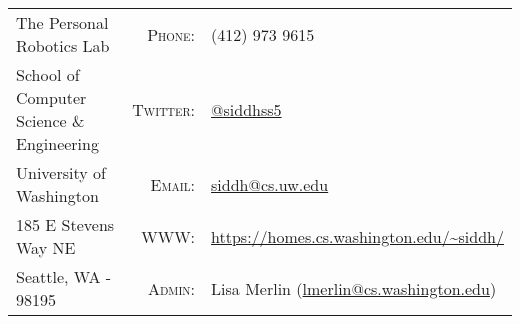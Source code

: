 
\begin{center}
\begin{tabular}{lrl}
The Personal Robotics Lab & \textsc{Phone:} & (412) 973 9615 \\
School of Computer Science \& Engineering& \textsc{Twitter:} & \href{https://twitter.com/siddhss5}{@siddhss5} \\
University of Washington& \textsc{Email:} & \url{siddh@cs.uw.edu}\\
185 E Stevens Way NE&  \textsc{WWW:} & \url{https://homes.cs.washington.edu/~siddh/}\\
Seattle, WA - 98195 & \textsc{Admin:} & Lisa Merlin (\url{lmerlin@cs.washington.edu})
\end{tabular}
\end{center}
